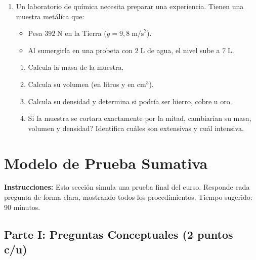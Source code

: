 \documentclass[12pt, letterpaper]{article}
\begin{document}
\begin{enumerate}[leftmargin=*, resume]
  \item \dificil{} Un laboratorio de química necesita preparar una experiencia. Tienen una muestra metálica que:
  \begin{itemize}
    \item Pesa $392\;\text{N}$ en la Tierra ($g = 9{,}8\;\text{m/s}^2$).
    \item Al sumergirla en una probeta con $2\;\text{L}$ de agua, el nivel sube a $7\;\text{L}$.
  \end{itemize}
  \begin{enumerate}[label=\alph*)]
    \item Calcula la masa de la muestra.
    \item Calcula su volumen (en litros y en cm$^3$).
    \item Calcula su densidad y determina si podría ser hierro, cobre u oro.
    \item Si la muestra se cortara exactamente por la mitad, \textquestiondown cambiarían su masa, volumen y densidad? Identifica cuáles son extensivas y cuál intensiva.
  \end{enumerate}
\end{enumerate}

\newpage

\section{Modelo de Prueba Sumativa}

\begin{cuadroextra}
\textbf{Instrucciones:} Esta sección simula una prueba final del curso. Responde cada pregunta de forma clara, mostrando todos los procedimientos. Tiempo sugerido: 90 minutos.
\end{cuadroextra}

\subsection{Parte I: Preguntas Conceptuales (2 puntos c/u)}
\end{document}
